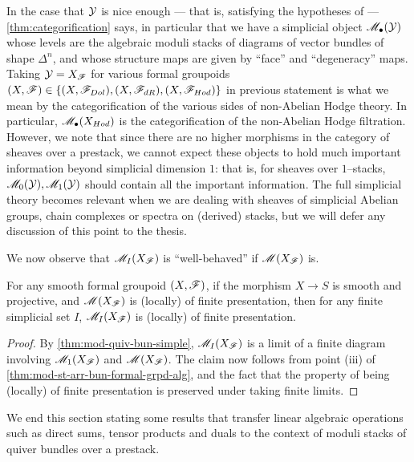\documentclass[11pt]{amsart}
\begin{document}
\begin{rmk}\label{rmk:smplcl-stacks}
In the case that $\mathcal{Y}$ is nice enough --- that is, satisfying the hypotheses
of \cite[Theorem 4.10]{ModQuivBun} --- \cref{thm:categorification} says, in
particular that we have a simplicial object $\mathscr{M}_{\bullet}(\mathcal{Y})$
whose levels are the algebraic moduli stacks of diagrams of vector bundles of
shape $\Delta^n$, and whose structure maps are given by ``face''
and ``degeneracy'' maps. Taking $\mathcal{Y} = X_\mathscr{F}$ for various formal groupoids
$(X, \sF) \in \set{(X, \sF_{Dol}), (X, \sF_{dR}), (X, \sF_{Hod})}$ in previous
statement is what we mean by the categorification of the various sides of
non-Abelian Hodge theory. In particular, $\mathscr{M}_\bullet(X_{Hod})$ is the
categorification of the non-Abelian Hodge filtration. However,
we note that since there are no higher morphisms in the category of sheaves
over a prestack, we cannot expect these objects to hold much important
information beyond simplicial dimension $1$: that is, for sheaves over
$1$--stacks, $\mathscr{M}_0(\mathcal{Y}), \mathscr{M}_1(\mathcal{Y})$ should contain all the important
information. The full simplicial theory becomes relevant
when we are dealing with sheaves of simplicial Abelian groups, chain complexes
or spectra on (derived) stacks, but we will defer any discussion of this point
to the thesis.
\end{rmk}

We now observe that $\mathscr{M}_I(X_\mathscr{F})$ is ``well-behaved'' if $\mathscr{M}(X_\mathscr{F})$ is.

\begin{thm}\label{thm:mod-quiv-bun-formal-grpd-loc-fin-pre}
For any smooth formal groupoid $(X, \mathscr{F})$, if the morphism $X \to S$
is smooth and projective, and $\mathscr{M}(X_\mathscr{F})$ is (locally) of finite presentation,
then for any finite simplicial set $I$, $\mathscr{M}_I(X_\mathscr{F})$ is (locally) of
finite presentation.
\end{thm}
\begin{proof}
By \cref{thm:mod-quiv-bun-simple}, $\mathscr{M}_I(X_\mathscr{F})$ is a limit of a finite
diagram involving $\mathscr{M}_1(X_\mathscr{F})$ and $\mathscr{M}(X_\mathscr{F})$. The claim now follows
from point (iii) of \cref{thm:mod-st-arr-bun-formal-grpd-alg}, and the fact
that the property of being (locally) of finite presentation is preserved under
taking finite limits.
\end{proof}

We end this section stating some results that transfer linear algebraic
operations such as direct sums, tensor products and duals to the context
of moduli stacks of quiver bundles over a prestack.
\end{document}
